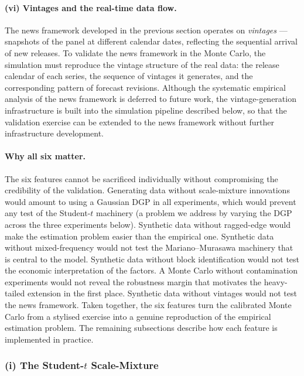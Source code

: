 \documentclass[11pt, a4paper, oneside]{article}
\begin{document}
\paragraph{(vi) Vintages and the real-time data flow.}
The news framework developed in the previous section operates on
\emph{vintages} — snapshots of the panel at different calendar
dates, reflecting the sequential arrival of new releases. To
validate the news framework in the Monte Carlo, the simulation
must reproduce the vintage structure of the real data: the release
calendar of each series, the sequence of vintages it generates,
and the corresponding pattern of forecast revisions. Although the
systematic empirical analysis of the news framework is deferred to
future work, the vintage-generation infrastructure is built into
the simulation pipeline described below, so that the validation
exercise can be extended to the news framework without further
infrastructure development.

\paragraph{Why all six matter.}
The six features cannot be sacrificed individually without
compromising the credibility of the validation. Generating data
without scale-mixture innovations would amount to using a Gaussian
DGP in all experiments, which would prevent any test of the
Student-$t$ machinery (a problem we address by varying the DGP
across the three experiments below). Synthetic data without
ragged-edge would make the estimation problem easier than the
empirical one. Synthetic data without mixed-frequency would not
test the Mariano--Murasawa machinery that is central to the model.
Synthetic data without block identification would not test the
economic interpretation of the factors. A Monte Carlo without
contamination experiments would not reveal the robustness margin
that motivates the heavy-tailed extension in the first place.
Synthetic data without vintages would not test the news framework.
Taken together, the six features turn the calibrated Monte Carlo
from a stylised exercise into a genuine reproduction of the
empirical estimation problem. The remaining subsections describe
how each feature is implemented in practice.

\subsubsection*{(i) The Student-$t$ Scale-Mixture}
\label{subsubsec:sim-scale-mixture}
\end{document}
